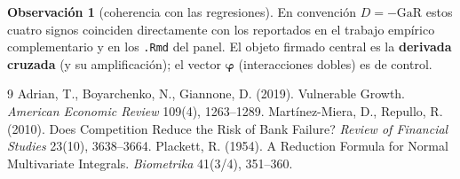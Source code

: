 \documentclass[11pt]{article}
\theoremstyle{plain}
\theoremstyle{definition}
\newtheorem{remark}{Observación}
\newcommand{\GaR}{\mathrm{GaR}}
\newcommand{\1}{\mathbf{1}}
\begin{document}
\begin{remark}[coherencia con las regresiones]
En convención $D=-\GaR$ estos cuatro signos coinciden directamente con los reportados en el trabajo empírico complementario y en los \texttt{.Rmd} del panel. El objeto firmado central es la \textbf{derivada cruzada} (y su amplificación); el vector $\boldsymbol\varphi$ (interacciones dobles) es de control.
\end{remark}

\begin{thebibliography}{9}
\small
{} Adrian, T., Boyarchenko, N., Giannone, D. (2019). Vulnerable Growth. \textit{American Economic Review} 109(4), 1263--1289.
 Martínez-Miera, D., Repullo, R. (2010). Does Competition Reduce the Risk of Bank Failure? \textit{Review of Financial Studies} 23(10), 3638--3664.
 Plackett, R. (1954). A Reduction Formula for Normal Multivariate Integrals. \textit{Biometrika} 41(3/4), 351--360.
\end{thebibliography}
\end{document}
